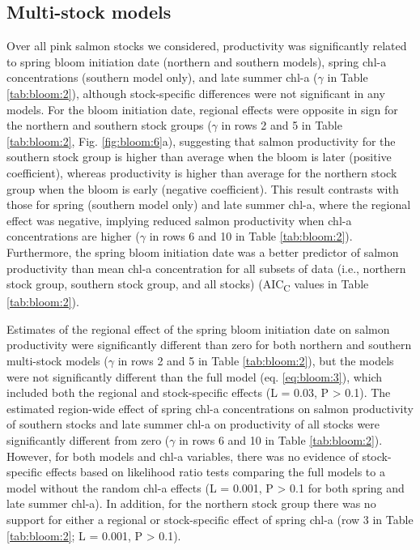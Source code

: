 \subsection{Multi-stock models}

Over all pink salmon stocks we considered, productivity was significantly
related to spring bloom initiation date (northern and southern models), spring
chl-a concentrations (southern model only), and late summer chl-a (\(\gamma\) in
Table \ref{tab:bloom:2}), although stock-specific differences were not
significant in any models. For the bloom initiation date, regional effects were
opposite in sign for the northern and southern stock groups (\(\gamma\) in rows
2 and 5 in Table \ref{tab:bloom:2}, Fig. \ref{fig:bloom:6}a), suggesting that
salmon productivity for the southern stock group is higher than average when the
bloom is later (positive coefficient), whereas productivity is higher than
average for the northern stock group when the bloom is early (negative
coefficient). This result contrasts with those for spring (southern model only)
and late summer chl-a, where the regional effect was negative, implying reduced
salmon productivity when chl-a concentrations are higher (\(\gamma\) in rows 6
and 10 in Table \ref{tab:bloom:2}). Furthermore, the spring bloom initiation
date was a better predictor of salmon productivity than mean chl-a concentration
for all subsets of data (i.e., northern stock group, southern stock group, and
all stocks) (AIC\textsubscript{C} values in Table \ref{tab:bloom:2}).

Estimates of the regional effect of the spring bloom initiation date on salmon
productivity were significantly different than zero for both northern and
southern multi-stock models (\(\gamma\) in rows 2 and 5 in Table
\ref{tab:bloom:2}), but the models were not significantly different than the
full model (eq. \ref{eq:bloom:3}), which included both the regional and
stock-specific effects (L = 0.03, P \textgreater{} 0.1). The estimated
region-wide effect of spring chl-a concentrations on salmon productivity of
southern stocks and late summer chl-a on productivity of all stocks were
significantly different from zero (\(\gamma\) in rows 6 and 10 in Table
\ref{tab:bloom:2}). However, for both models and chl-a variables, there was no
evidence of stock-specific effects based on likelihood ratio tests comparing the
full models to a model without the random chl-a effects (L = 0.001, P
\textgreater{} 0.1 for both spring and late summer chl-a). In addition, for the
northern stock group there was no support for either a regional or
stock-specific effect of spring chl-a (row 3 in Table \ref{tab:bloom:2}; L =
0.001, P \textgreater{} 0.1).

